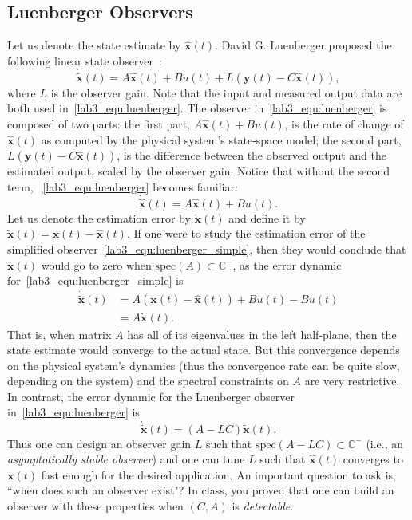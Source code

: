 \subsection{Luenberger Observers}
Let us denote the state estimate by $\hat{\mathbf{x}}(t)$. David G. Luenberger proposed the following linear state observer~\cite{david1971introduction}:
\begin{equation}\label{lab3_equ:luenberger}
    \mathbf{\dot{\tilde{x}}}(t)=A\hat{\mathbf{x}}(t)+Bu(t)+L(\mathbf{y}(t)-C\hat{\mathbf{x}}(t)),
\end{equation}
where $L$ is the observer gain. Note that the input and measured output data are both used in~\eqref{lab3_equ:luenberger}. The observer in~\eqref{lab3_equ:luenberger} is composed of two parts: the first part, $A\hat{\mathbf{x}}(t)+Bu(t)$, is the rate of change of $\hat{\mathbf{x}}(t)$ as computed by the physical system's state-space model; the second part, $L(\mathbf{y}(t)-C\hat{\mathbf{x}}(t))$, is the difference between the observed output and the estimated output, scaled by the observer gain. Notice that without the second term, ~\eqref{lab3_equ:luenberger} becomes familiar:
\begin{equation}\label{lab3_equ:luenberger_simple}
    \mathbf{\dot{\hat{x}}}(t)=A\hat{\mathbf{x}}(t)+Bu(t).
\end{equation}
Let us denote the estimation error by $\tilde{\mathbf{x}}(t)$ and define it by $\tilde{\mathbf{x}}(t) = \mathbf{x}(t)-\hat{\mathbf{x}}(t)$. If one were to study the estimation error of the simplified observer~\eqref{lab3_equ:luenberger_simple}, then they would conclude that $\tilde{\mathbf{x}}(t)$ would go to zero when $\text{spec}(A) \subset \mathbb{C}^-$, as the error dynamic for~\eqref{lab3_equ:luenberger_simple} is
\begin{align*}
    \mathbf{\dot{\tilde{x}}}(t) & = A \left(\mathbf{x}(t)-\hat{\mathbf{x}}(t)\right)+Bu(t) - Bu(t) \\
                                & = A\tilde{\mathbf{x}}(t).
\end{align*}
That is, when matrix $A$ has all of its eigenvalues in the left half-plane, then the state estimate would converge to the actual state. But this convergence depends on the physical system's dynamics (thus the convergence rate can be quite slow, depending on the system) and the spectral constraints on $A$ are very restrictive. In contrast, the error dynamic for the Luenberger observer in~\eqref{lab3_equ:luenberger} is
\begin{equation}\label{lab3_equ:luenberger_error}
    \mathbf{\dot{\tilde{x}}}(t) = (A-LC) \tilde{\mathbf{x}}(t).
\end{equation}
Thus one can design an observer gain $L$ such that $\text{spec}(A-LC) \subset \mathbb{C}^-$ (i.e., an \emph{asymptotically stable observer}) and one can tune $L$ such that $\hat{\mathbf{x}}(t)$ converges to $\mathbf{x}(t)$ fast enough for the desired application. An important question to ask is, ``when does such an observer exist"? In class, you proved that one can build an observer with these properties when $(C,A)$ is \emph{detectable}.

